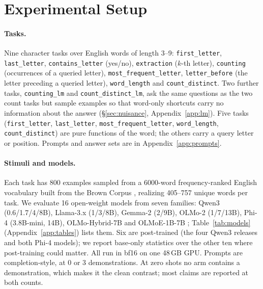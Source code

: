 \section{Experimental Setup}
\label{sec:setup}

\paragraph{Tasks.}
Nine character tasks over English words of length 3--9: \texttt{first\_letter},
\texttt{last\_letter}, \texttt{contains\_letter} (yes/no), \texttt{extraction} ($k$-th letter),
\texttt{counting} (occurrences of a queried letter), \texttt{most\_frequent\_letter},
\texttt{letter\_before} (the letter preceding a queried letter), \texttt{word\_length} and
\texttt{count\_distinct}. Two further tasks, \texttt{counting\_lm} and \texttt{count\_distinct\_lm},
ask the same questions as the two count tasks but sample examples so that word-only shortcuts
carry no information about the answer (\S\ref{sec:nuisance}, Appendix~\ref{app:lm}). Five tasks
(\texttt{first\_letter}, \texttt{last\_letter}, \texttt{most\_frequent\_letter},
\texttt{word\_length}, \texttt{count\_distinct}) are pure functions of the word; the others carry a
query letter or position. Prompts and answer sets are in Appendix~\ref{app:prompts}.

\paragraph{Stimuli and models.}
Each task has 800 examples sampled from a 6000-word frequency-ranked English vocabulary built from
the Brown Corpus \citep{kucera1967brown}, realizing 405--757 unique words per task. We evaluate 16
open-weight models from seven families: Qwen3 (0.6/1.7/4/8B), Llama-3.x (1/3/8B), Gemma-2
(2/9B), OLMo-2 (1/7/13B), Phi-4 (3.8B-mini, 14B), OLMo-Hybrid-7B and OLMoE-1B-7B
\citep{qwen3report,llama3report,gemma2report,phi4report,olmo2report,olmoereport,olmohybridreport};
Table~\ref{tab:models} (Appendix~\ref{app:tables}) lists them.
Six are post-trained (the four Qwen3 releases and both Phi-4 models); we report base-only
statistics over the other ten where post-training could matter. All run in bf16 on one 48\,GB
GPU. Prompts are completion-style, at 0 or 3 demonstrations. At zero shots no arm contains a
demonstration, which makes it the clean contrast; most claims are reported at both counts.


